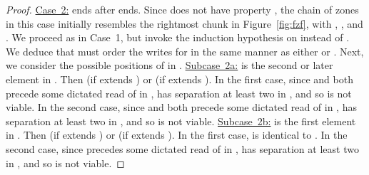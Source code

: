 \begin{lemma}
\begin{proof}
\noindent\underline{Case~2:}  ends after  ends.
Since  does not have property , the chain of zones in this case initially resembles the
rightmost chunk in Figure~\ref{fig:fzf}, with , , and .
We proceed as in Case~1, but invoke the induction hypothesis on 
 instead of .
We deduce that  must order the writes for  in the same manner as either
 or .
Next, we consider the possible positions of  in .
\newline\noindent\underline{Subcase~2a:}  is the second or later element in .
Then  (if  extends ) or  (if  extends ).
In the first case, since  and  both precede some dictated read of  in ,
 has separation at least two in , and so  is not viable.
In the second case, since  and  both precede some dictated read of  in ,
 has separation at least two in , and so  is not viable.
\newline\noindent\underline{Subcase~2b:}  is the first element in .
Then  (if  extends ) or  (if  extends ).
In the first case,  is identical to .
In the second case, since  precedes some dictated read of  in ,
 has separation at least two in , and so  is not viable.
\end{proof}
\end{lemma}


